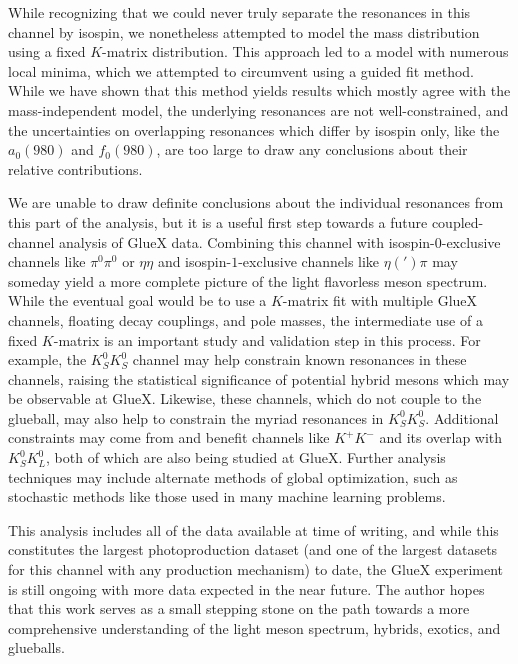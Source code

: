 While recognizing that we could never truly separate the resonances in this channel by isospin, we nonetheless attempted to model the mass distribution using a fixed $K$-matrix distribution. This approach led to a model with numerous local minima, which we attempted to circumvent using a guided fit method. While we have shown that this method yields results which mostly agree with the mass-independent model, the underlying resonances are not well-constrained, and the uncertainties on overlapping resonances which differ by isospin only, like the $a_0(980)$ and $f_0(980)$, are too large to draw any conclusions about their relative contributions.

We are unable to draw definite conclusions about the individual resonances from this part of the analysis, but it is a useful first step towards a future coupled-channel analysis of GlueX data. Combining this channel with isospin-$0$-exclusive channels like $\pi^0\pi^0$ or $\eta\eta$ and isospin-$1$-exclusive channels like $\eta(')\pi$ may someday yield a more complete picture of the light flavorless meson spectrum. While the eventual goal would be to use a $K$-matrix fit with multiple GlueX channels, floating decay couplings, and pole masses, the intermediate use of a fixed $K$-matrix is an important study and validation step in this process. For example, the $K_S^0K_S^0$ channel may help constrain known resonances in these channels, raising the statistical significance of potential hybrid mesons which may be observable at GlueX. Likewise, these channels, which do not couple to the glueball, may also help to constrain the myriad resonances in $K_S^0K_S^0$. Additional constraints may come from and benefit channels like $K^+K^-$ and its overlap with $K_S^0K_L^0$, both of which are also being studied at GlueX. Further analysis techniques may include alternate methods of global optimization, such as stochastic methods like those used in many machine learning problems.

This analysis includes all of the data available at time of writing, and while this constitutes the largest photoproduction dataset (and one of the largest datasets for this channel with any production mechanism) to date, the GlueX experiment is still ongoing with more data expected in the near future. The author hopes that this work serves as a small stepping stone on the path towards a more comprehensive understanding of the light meson spectrum, hybrids, exotics, and glueballs.
